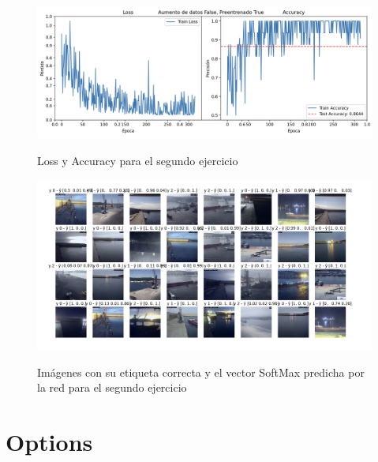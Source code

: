 \documentclass{article}
\begin{document}
\begin{figure}[h]
	\centering
	\includegraphics[width=0.9\linewidth]{lossEj2}
	\label{fig:lossEj2}
	\caption{Loss y Accuracy para el segundo ejercicio}
\end{figure}

\begin{figure}[h]
	\centering
	\includegraphics[width=0.8\linewidth]{imagenesEj2}
	\label{fig:imagenesEj2}
	\caption{Imágenes con su etiqueta correcta y el vector SoftMax predicha por la red para el segundo ejercicio}
\end{figure}


\section*{Options}
\end{document}
